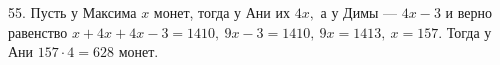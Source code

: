 55. Пусть у Максима $x$ монет, тогда у Ани их $4x,$ а у Димы --- $4x-3$ и верно равенство $x+4x+4x-3=1410,\ 9x-3=1410,\ 9x=1413,\ x=157.$ Тогда у Ани $157\cdot4=628$ монет.\\
